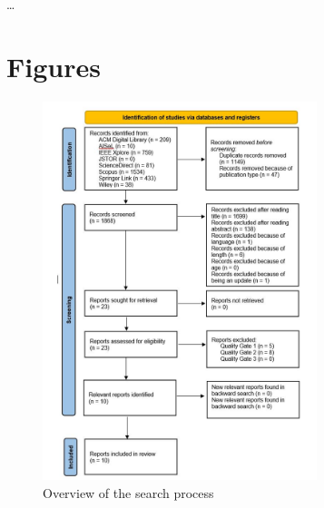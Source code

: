 \documentclass{bmcart}
\begin{document}
\begin{backmatter}
\ldots





\section{Figures}

\begin{figure}[h]
    \centering 
    \includegraphics[width=8cm]{Media/PRISMA-Flowchart-V2.JPG}
    \caption{Overview of the search process}
    \label{fig:PRISMA}
\end{figure}


\end{backmatter}
\end{document}
